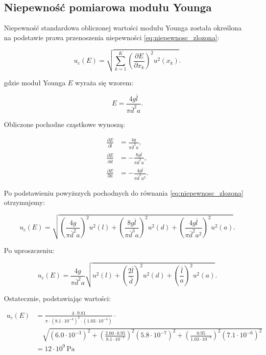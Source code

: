\documentclass[a4paper,12pt]{article}
\begin{document}
\subsection{Niepewność pomiarowa modułu Younga}

Niepewność standardowa obliczonej wartości modułu Younga została określona na podstawie prawa przenoszenia niepewności \eqref{eq:niepewnosc_zlozona}:

\begin{equation}
    \label{eq:niepewnosc_zlozona}
    u_c(E) = \sqrt{\sum_{k=1}^{K} \left( \frac{\partial E}{\partial x_k} \right)^2 u^2(x_k)}.
\end{equation}

gdzie moduł Younga \( E \) wyraża się wzorem:

\begin{equation*}
    E = \frac{4g\bar{l}}{\pi\bar{d}^2 a}.
\end{equation*}

Obliczone pochodne cząstkowe wynoszą:

\begin{align*}
    \frac{\partial E}{\partial \bar{l}} & = \frac{4g}{\pi \bar{d}^2 a},           \\
    \frac{\partial E}{\partial \bar{d}} & = -\frac{8g\bar{l}}{\pi \bar{d}^3 a},   \\
    \frac{\partial E}{\partial a}       & = -\frac{4g\bar{l}}{\pi \bar{d}^2 a^2}.
\end{align*}

Po podstawieniu powyższych pochodnych do równania \eqref{eq:niepewnosc_zlozona} otrzymujemy:

\begin{equation*}
    u_c(E) = \sqrt{\left( \frac{4g}{\pi \bar{d}^2 a} \right)^2 u^2(l)
        + \left( \frac{8g\bar{l}}{\pi \bar{d}^3 a} \right)^2 u^2(d)
        + \left( \frac{4g\bar{l}}{\pi \bar{d}^2 a^2} \right)^2 u^2(a)}.
\end{equation*}

Po uproszczeniu:

\begin{equation*}
    u_c(E) = \frac{4g}{\pi \bar{d}^2 a}
    \sqrt{ u^2(l) + \left( \frac{2\bar{l}}{\bar{d}} \right)^2 u^2(d) + \left( \frac{\bar{l}}{a} \right)^2 u^2(a) }.
\end{equation*}

Ostatecznie, podstawiając wartości:

\begin{align*}
    u_c(E) & = \frac{4 \cdot 9.81}{\pi \cdot (8.1 \cdot 10^{-4})^2 \cdot (1.03 \cdot 10^{-4})} \cdot
    \\
           & \quad \sqrt{ (6.0 \cdot 10^{-3})^2 + \left( \frac{2.00 \cdot 0.95}{8.1 \cdot 10^{-4}} \right)^2 (5.8 \cdot 10^{-7})^2 + \left( \frac{0.95}{1.03 \cdot 10^{-4}} \right)^2 (7.1 \cdot 10^{-6})^2 }
    \\
           & = 12 \cdot 10^9\,\text{Pa}
\end{align*}
\end{document}
